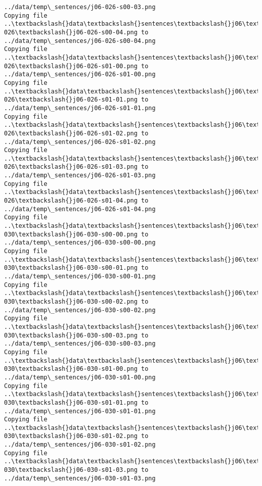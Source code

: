 \documentclass[11pt]{article}
\begin{document}
\begin{Verbatim}[commandchars=\\\{\}]
../data/temp\_sentences/j06-026-s00-03.png
Copying file ..\textbackslash{}data\textbackslash{}sentences\textbackslash{}j06\textbackslash{}j06-026\textbackslash{}j06-026-s00-04.png to
../data/temp\_sentences/j06-026-s00-04.png
Copying file ..\textbackslash{}data\textbackslash{}sentences\textbackslash{}j06\textbackslash{}j06-026\textbackslash{}j06-026-s01-00.png to
../data/temp\_sentences/j06-026-s01-00.png
Copying file ..\textbackslash{}data\textbackslash{}sentences\textbackslash{}j06\textbackslash{}j06-026\textbackslash{}j06-026-s01-01.png to
../data/temp\_sentences/j06-026-s01-01.png
Copying file ..\textbackslash{}data\textbackslash{}sentences\textbackslash{}j06\textbackslash{}j06-026\textbackslash{}j06-026-s01-02.png to
../data/temp\_sentences/j06-026-s01-02.png
Copying file ..\textbackslash{}data\textbackslash{}sentences\textbackslash{}j06\textbackslash{}j06-026\textbackslash{}j06-026-s01-03.png to
../data/temp\_sentences/j06-026-s01-03.png
Copying file ..\textbackslash{}data\textbackslash{}sentences\textbackslash{}j06\textbackslash{}j06-026\textbackslash{}j06-026-s01-04.png to
../data/temp\_sentences/j06-026-s01-04.png
Copying file ..\textbackslash{}data\textbackslash{}sentences\textbackslash{}j06\textbackslash{}j06-030\textbackslash{}j06-030-s00-00.png to
../data/temp\_sentences/j06-030-s00-00.png
Copying file ..\textbackslash{}data\textbackslash{}sentences\textbackslash{}j06\textbackslash{}j06-030\textbackslash{}j06-030-s00-01.png to
../data/temp\_sentences/j06-030-s00-01.png
Copying file ..\textbackslash{}data\textbackslash{}sentences\textbackslash{}j06\textbackslash{}j06-030\textbackslash{}j06-030-s00-02.png to
../data/temp\_sentences/j06-030-s00-02.png
Copying file ..\textbackslash{}data\textbackslash{}sentences\textbackslash{}j06\textbackslash{}j06-030\textbackslash{}j06-030-s00-03.png to
../data/temp\_sentences/j06-030-s00-03.png
Copying file ..\textbackslash{}data\textbackslash{}sentences\textbackslash{}j06\textbackslash{}j06-030\textbackslash{}j06-030-s01-00.png to
../data/temp\_sentences/j06-030-s01-00.png
Copying file ..\textbackslash{}data\textbackslash{}sentences\textbackslash{}j06\textbackslash{}j06-030\textbackslash{}j06-030-s01-01.png to
../data/temp\_sentences/j06-030-s01-01.png
Copying file ..\textbackslash{}data\textbackslash{}sentences\textbackslash{}j06\textbackslash{}j06-030\textbackslash{}j06-030-s01-02.png to
../data/temp\_sentences/j06-030-s01-02.png
Copying file ..\textbackslash{}data\textbackslash{}sentences\textbackslash{}j06\textbackslash{}j06-030\textbackslash{}j06-030-s01-03.png to
../data/temp\_sentences/j06-030-s01-03.png

\end{Verbatim}
\end{document}
